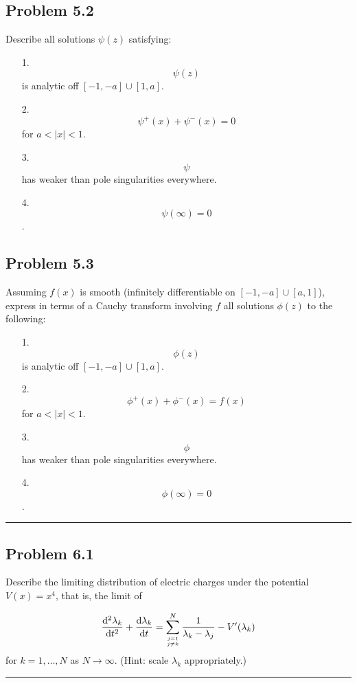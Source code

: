 \documentclass[12pt,a4paper]{article}
\def\D{ {\rm d} }
\begin{document}
\subsection{Problem 5.2}
Describe all solutions $\psi(z)$ satisfying:

\begin{itemize}
\item[1. ] \[
\psi(z)
\]
is analytic off $[-1,-a] \cup [1,a]$.


\item[2. ] \[
\psi^+(x) + \psi^-(x) = 0
\]
for $a < |x| < 1$.


\item[3. ] \[
\psi
\]
has weaker than pole singularities everywhere.


\item[4. ] \[
\psi(\infty) = 0
\]
.

\end{itemize}
\subsection{Problem 5.3}
Assuming $f(x)$ is smooth (infinitely differentiable on $[-1,-a] \cup [a, 1]$), express  in terms of a Cauchy transform involving $f$ all solutions $\phi(z)$ to the following:

\begin{itemize}
\item[1. ] \[
\phi(z)
\]
is analytic off $[-1,-a] \cup [1,a]$.


\item[2. ] \[
\phi^+(x) + \phi^-(x) = f(x)
\]
for $a < |x| < 1$.


\item[3. ] \[
\phi
\]
has weaker than pole singularities everywhere.


\item[4. ] \[
\phi(\infty) = 0
\]
.

\end{itemize}
\rule{\textwidth}{1pt}
\subsection{Problem 6.1}
Describe the limiting distribution of electric charges under the potential $V(x) = x^4$, that is, the limit of

\[
{\D^2 \lambda_k \over \D t^2} + {\D \lambda_k \over \D t}  = \sum_{j=1 \atop j \neq k}^N {1 \over \lambda_k -\lambda_j} - V'(\lambda_k)
\]
for $k = 1,\ldots, N$ as $N \rightarrow \infty$.  (Hint: scale $\lambda_k$ appropriately.)

\rule{\textwidth}{1pt}
\end{document}
